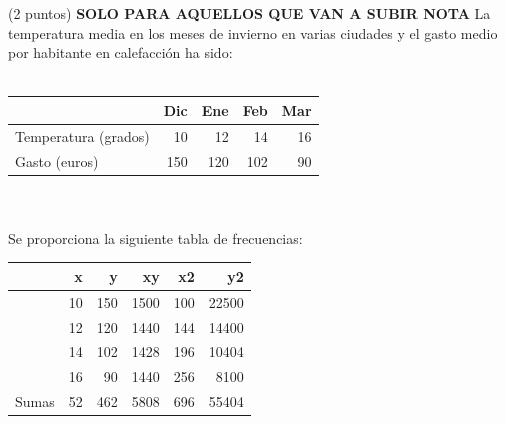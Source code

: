 \documentclass[addpoints,spanish, 12pt,a4paper]{exam}
\begin{document}
\begin{questions}



        \question (2 puntos) \textbf{SOLO PARA AQUELLOS QUE VAN A SUBIR NOTA} La temperatura media en los meses de invierno en varias ciudades y el gasto medio por habitante en
calefacción ha sido: \\ \\\begin{tabular}{lrrrr}
\hline
                      &   Dic &   Ene &   Feb &   Mar \\
\hline
 Temperatura (grados) &  10 &  12 &  14 &  16 \\
 Gasto (euros)        & 150 & 120 & 102 &  90 \\
\hline
\end{tabular} \\ \\
Se proporciona la siguiente tabla de frecuencias:

\begin{tabular}{rrrrrr}
\hline
    &   x &   y &   xy &   x2 &    y2 \\
\hline
  &  10 & 150 & 1500 &  100 & 22500 \\
  &  12 & 120 & 1440 &  144 & 14400 \\
  &  14 & 102 & 1428 &  196 & 10404 \\
  &  16 &  90 & 1440 &  256 &  8100 \\
  Sumas &  52 & 462 & 5808 &  696 & 55404 \\
\hline


\end{tabular}
\end{questions}
\end{document}
